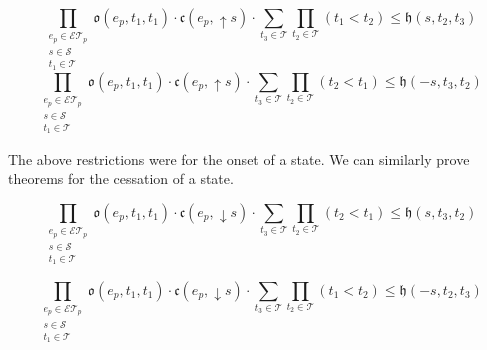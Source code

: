 \begin{equation}\label{ax:transition}
   \prod_{\substack{e_p \in \mathcal{ET}_p \\ s \in \mathcal{S} \\ t_1 \in \mathcal{T}}} \mathfrak{o}(e_p, t_1, t_1) \cdot \mathfrak{c}(e_p, \uparrow s) \cdot
    \sum_{t_3 \in \mathcal{T}}\prod_{t_2 \in \mathcal{T}} (t_1 < t_2)  \leq \mathfrak{h}(s, t_2, t_3)
\end{equation}
\begin{equation}
    \prod_{\substack{e_p \in \mathcal{ET}_p \\ s \in \mathcal{S} \\ t_1 \in \mathcal{T}}}\mathfrak{o}(e_p, t_1, t_1) \cdot \mathfrak{c}(e_p, \uparrow s) \cdot
     \sum_{t_3 \in \mathcal{T}} \prod_{t_2 \in \mathcal{T}} (t_2 < t_1)  \leq \mathfrak{h}(-s, t_3, t_2)
\end{equation}

The above restrictions were for the onset of a state. We can similarly prove theorems for the cessation of a state.

\begin{theorem}\label{thm:cessation}
    \begin{equation}
        \prod_{\substack{e_p \in \mathcal{ET}_p \\ s \in \mathcal{S} \\ t_1 \in \mathcal{T}}}\mathfrak{o}(e_p, t_1, t_1) \cdot \mathfrak{c}(e_p, \downarrow s) \cdot 
         \sum_{t_3 \in \mathcal{T}} \prod_{t_2 \in \mathcal{T}} (t_2 < t_1) \leq \mathfrak{h}(s, t_3, t_2)
    \end{equation}
\end{theorem}
\begin{theorem}\label{thm:cessation_2}
    \begin{equation}
      \prod_{\substack{e_p \in \mathcal{ET}_p \\ s \in \mathcal{S} \\ t_1 \in \mathcal{T}}}  \mathfrak{o}(e_p, t_1, t_1) \cdot \mathfrak{c}(e_p, \downarrow s) \cdot
       \sum_{t_3 \in \mathcal{T}} \prod_{t_2 \in \mathcal{T}} (t_1 < t_2) \leq \mathfrak{h}(-s, t_2, t_3)
    \end{equation}
\end{theorem}


